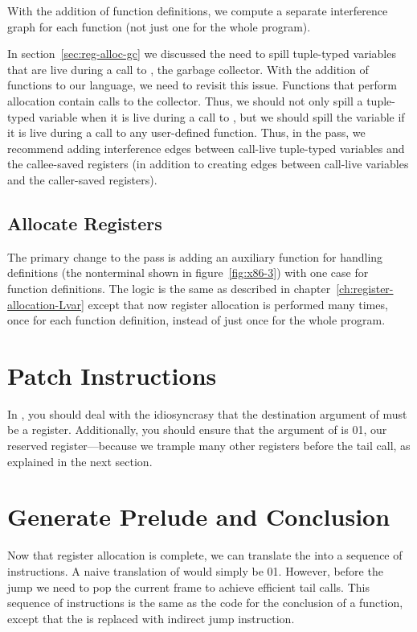 \documentclass[7x10]{TimesAPriori_MIT}%
\def\xeightysixEd{0}
\def\riscvEd{1}
\def\architecture{1}
\newcommand\ifriscv[1]{\if\architecture\riscvEd{#1}\fi}
\newcommand\ifxeightsix[1]{\if\architecture\xeightysixEd{#1}\fi}
\numberwithin{theorem}{chapter}
\numberwithin{definition}{chapter}
\numberwithin{equation}{chapter}
\begin{document}
With the addition of function definitions, we compute a separate interference
graph for each function (not just one for the whole program).

In section~\ref{sec:reg-alloc-gc} we discussed the need to
spill tuple-typed variables that are live during a call to
, the garbage collector.  With the addition of functions
to our language, we need to revisit this issue. Functions that perform
allocation contain calls to the collector. Thus, we should not only
spill a tuple-typed variable when it is live during a call to
, but we should spill the variable if it is live during
a call to any user-defined function. Thus, in the
 pass, we recommend adding interference
edges between call-live tuple-typed variables and the callee-saved
registers (in addition to creating edges between
call-live variables and the caller-saved registers).


\subsection{Allocate Registers}

The primary change to the  pass is adding an
auxiliary function for handling definitions (the \Def{} nonterminal
shown in figure~\ref{fig:x86-3}) with one case for function
definitions. The logic is the same as described in
chapter~\ref{ch:register-allocation-Lvar} except that now register
allocation is performed many times, once for each function definition,
instead of just once for the whole program.


\section{Patch Instructions}

In , you should deal with the {\ArchName}
idiosyncrasy that the destination argument of {\ILEA} must be a
register. Additionally, you should ensure that the argument of
 is \ifxeightsix{\RAX}\ifriscv{}, our reserved register---because we
trample many other registers before the tail call, as explained in the
next section.

\section{Generate Prelude and Conclusion}

Now that register allocation is complete, we can translate the
 into a sequence of instructions. A naive translation of
 would simply be
\ifxeightsix{}\ifriscv{}.  However,
before the jump we need to pop the current frame to achieve efficient
tail calls.  This sequence of instructions is the same as the code for
the conclusion of a function, except that the \RET{} is replaced with
indirect jump instruction.
\end{document}
